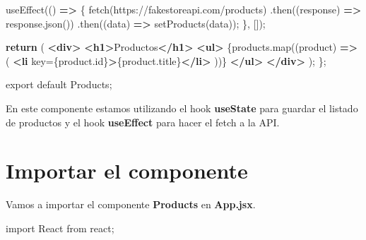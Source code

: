 \documentclass[
  a4paper,
  DIV=11,
  numbers=noendperiod,
  onepage,
  openany]{scrreprt}
\newenvironment{Shaded}{\begin{snugshade}}{\end{snugshade}}
\newcommand{\AttributeTok}[1]{\textcolor[rgb]{0.40,0.45,0.13}{#1}}
\newcommand{\ControlFlowTok}[1]{\textcolor[rgb]{0.00,0.23,0.31}{\textbf{#1}}}
\newcommand{\FunctionTok}[1]{\textcolor[rgb]{0.28,0.35,0.67}{#1}}
\newcommand{\ImportTok}[1]{\textcolor[rgb]{0.00,0.46,0.62}{#1}}
\newcommand{\KeywordTok}[1]{\textcolor[rgb]{0.00,0.23,0.31}{\textbf{#1}}}
\newcommand{\NormalTok}[1]{\textcolor[rgb]{0.00,0.23,0.31}{#1}}
\newcommand{\OperatorTok}[1]{\textcolor[rgb]{0.37,0.37,0.37}{#1}}
\newcommand{\OtherTok}[1]{\textcolor[rgb]{0.00,0.23,0.31}{#1}}
\newcommand{\StringTok}[1]{\textcolor[rgb]{0.13,0.47,0.30}{#1}}
\newcommand{\VariableTok}[1]{\textcolor[rgb]{0.07,0.07,0.07}{#1}}
\begin{document}
\begin{tcolorbox}
\begin{Shaded}
\begin{Highlighting}[]
  \FunctionTok{useEffect}\NormalTok{(() }\KeywordTok{=\textgreater{}}\NormalTok{ \{}
    \FunctionTok{fetch}\NormalTok{(}\StringTok{\textquotesingle{}https://fakestoreapi.com/products\textquotesingle{}}\NormalTok{)}
      \OperatorTok{.}\FunctionTok{then}\NormalTok{((response) }\KeywordTok{=\textgreater{}}\NormalTok{ response}\OperatorTok{.}\FunctionTok{json}\NormalTok{())}
      \OperatorTok{.}\FunctionTok{then}\NormalTok{((data) }\KeywordTok{=\textgreater{}} \FunctionTok{setProducts}\NormalTok{(data))}\OperatorTok{;}
\NormalTok{  \}}\OperatorTok{,}\NormalTok{ [])}\OperatorTok{;}

  \ControlFlowTok{return}\NormalTok{ (}
    \KeywordTok{\textless{}div\textgreater{}}
      \KeywordTok{\textless{}h1\textgreater{}}\NormalTok{Productos}\KeywordTok{\textless{}/h1\textgreater{}}
      \KeywordTok{\textless{}ul\textgreater{}}
        \VariableTok{\{}\NormalTok{products}\OperatorTok{.}\FunctionTok{map}\NormalTok{((product) }\KeywordTok{=\textgreater{}}\NormalTok{ (}
          \KeywordTok{\textless{}li} \OtherTok{key}\OperatorTok{=}\VariableTok{\{}\NormalTok{product}\OperatorTok{.}\AttributeTok{id}\VariableTok{\}}\KeywordTok{\textgreater{}}\VariableTok{\{}\NormalTok{product}\OperatorTok{.}\AttributeTok{title}\VariableTok{\}}\KeywordTok{\textless{}/li\textgreater{}}
\NormalTok{        ))}\VariableTok{\}}
      \KeywordTok{\textless{}/ul\textgreater{}}
    \KeywordTok{\textless{}/div\textgreater{}}
\NormalTok{  )}\OperatorTok{;}
\NormalTok{\}}\OperatorTok{;}

\ImportTok{export} \ImportTok{default}\NormalTok{ Products}\OperatorTok{;}
\end{Highlighting}
\end{Shaded}

En este componente estamos utilizando el hook \textbf{useState} para
guardar el listado de productos y el hook \textbf{useEffect} para hacer
el fetch a la API.

\section{Importar el componente}\label{importar-el-componente-1}

Vamos a importar el componente \textbf{Products} en \textbf{App.jsx}.

\begin{Shaded}
\begin{Highlighting}[]
\ImportTok{import}\NormalTok{ React }\ImportTok{from} \StringTok{\textquotesingle{}react\textquotesingle{}}\OperatorTok{;}


\end{Highlighting}
\end{Shaded}
\end{tcolorbox}
\end{document}
